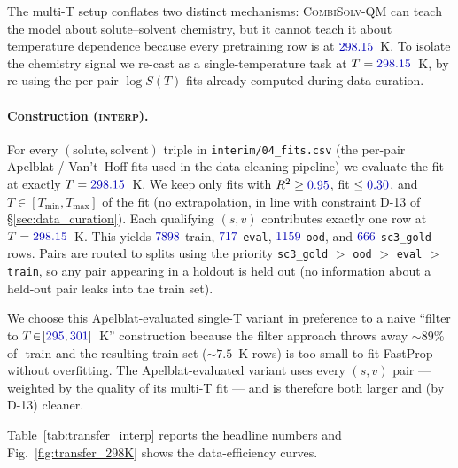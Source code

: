 The multi-T setup conflates two distinct mechanisms:
\textsc{CombiSolv-QM} can teach the model about solute--solvent
chemistry, but it cannot teach it about temperature dependence
because every pretraining row is at $\numval{298.15}$~K.  To isolate
the chemistry signal we re-cast \scthree{} as a single-temperature
task at $T = \numval{298.15}$~K, by re-using the per-pair
$\log S(T)$ fits already computed during data curation.

\paragraph{Construction (\textsc{interp}).}  For every
$({\text{solute}}, {\text{solvent}})$ triple in
\texttt{interim/04\_fits.csv} (the per-pair Apelblat / Van't~Hoff
fits used in the data-cleaning pipeline) we evaluate the fit at
exactly $T = \numval{298.15}$~K.  We keep only fits with
$\Rr \geq \numval{0.95}$, fit \RMSE{} $\leq \numval{0.30}$, and
$T \in [T_{\min}, T_{\max}]$ of the fit (no extrapolation, in line
with constraint D-13 of §\ref{sec:data_curation}).  Each
qualifying $(s, v)$ contributes exactly one row at $T =
\numval{298.15}$~K.  This yields $\numval{7898}$ train,
$\numval{717}$ \texttt{eval}, $\numval{1159}$ \texttt{ood}, and
$\numval{666}$ \texttt{sc3\_gold} rows.  Pairs are routed to splits
using the priority \texttt{sc3\_gold} $>$ \texttt{ood} $>$
\texttt{eval} $>$ \texttt{train}, so any pair appearing in a
holdout is held out (no information about a held-out pair leaks
into the train set).

We choose this Apelblat-evaluated single-T variant in preference to a
naive ``filter to $T \! \in \! [\numval{295}, \numval{301}]$~K''
construction because the filter approach throws away $\sim \! 89$\%
of \scthree{}-train and the resulting train set ($\sim \! 7.5$~K
rows) is too small to fit FastProp without overfitting.  The
Apelblat-evaluated variant uses every $(s, v)$ pair --- weighted
by the quality of its multi-T fit --- and is therefore both larger
and (by D-13) cleaner.

Table~\ref{tab:transfer_interp} reports the headline numbers and
Fig.~\ref{fig:transfer_298K} shows the data-efficiency curves.

